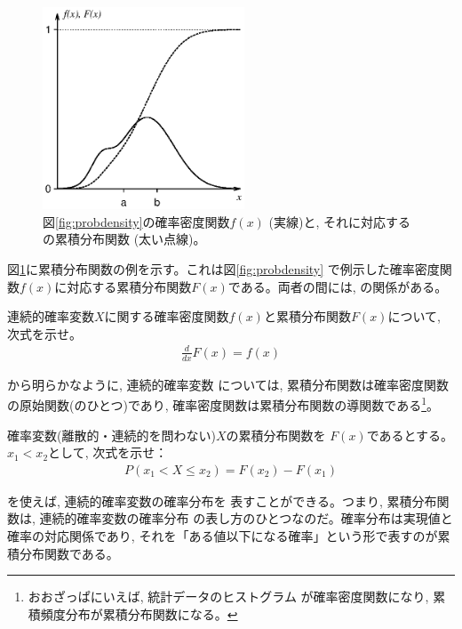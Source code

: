 \begin{figure}[h]
    \centering
    \includegraphics[width=6cm]{probdist.eps}
    \caption{図\ref{fig:probdensity}の確率密度関数$f(x)$ (実線)と, それに対応するの累積分布関数 (太い点線)。}\label{fig:probdist.eps}
\end{figure}

図\ref{fig:probdist.eps}に累積分布関数の例を示す。これは図\ref{fig:probdensity}
で例示した確率密度関数$f(x)$に対応する累積分布関数$F(x)$である。両者の間には,  
の関係がある。

\begin{q}\label{q:stat_distF} 連続的確率変数$X$に関する確率密度関数$f(x)$と累積分布関数$F(x)$について, 次式を示せ。
\begin{eqnarray}
\frac{d}{dx}F(x)=f(x)\label{eq:stat_distF_diff}
\end{eqnarray}
\end{q}\mv

から明らかなように, 連続的確率変数
については, 累積分布関数は確率密度関数の原始関数(のひとつ)であり, 
確率密度関数は累積分布関数の導関数である\footnote{おおざっぱにいえば, 統計データのヒストグラム
が確率密度関数になり, 累積頻度分布が累積分布関数になる。}。

\begin{q}\label{q:stat_distF12} 確率変数(離散的・連続的を問わない)$X$の累積分布関数を
$F(x)$であるとする。$x_1<x_2$として, 次式を示せ：
\begin{eqnarray}
P(x_1 < X \le x_2)=F(x_2)-F(x_1)\label{eq:stat_distF12}
\end{eqnarray}
\end{q}\mv

を使えば, 連続的確率変数の確率分布を
表すことができる。つまり, 累積分布関数は, 連続的確率変数の確率分布
の表し方のひとつなのだ。確率分布は実現値と確率の対応関係であり, 
それを「ある値以下になる確率」という形で表すのが累積分布関数である。

